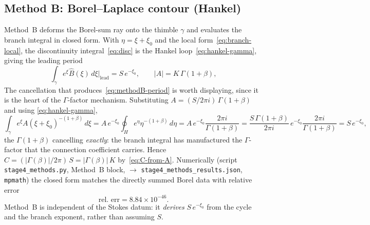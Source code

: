 \documentclass[11pt,reqno]{amsart}
\theoremstyle{plain}
\theoremstyle{definition}
\newcommand{\Bhat}{\widehat{B}}
\newcommand{\xizero}{\xi_0}
\providecommand{\C}{}\renewcommand{\C}{C}
\begin{document}
\subsection{Method B: Borel--Laplace contour (Hankel)}\label{sub:methodB}
Method~B deforms the Borel-sum ray onto the thimble $\gamma$ and evaluates the branch integral in
closed form. With $\eta=\xi+\xizero$ and the local form~\eqref{eq:branch-local}, the
discontinuity integral~\eqref{eq:disc} is the Hankel loop~\eqref{eq:hankel-gamma}, giving the
leading period
\begin{equation}\label{eq:methodB-period}
  \int_\gamma e^{\xi}\Bhat(\xi)\,d\xi\Big|_{\text{lead}}=S\,e^{-\xizero},\qquad
  \lvert A\rvert=K\,\Gamma(1+\beta),
\end{equation}
The cancellation that produces~\eqref{eq:methodB-period} is worth displaying, since it is the heart
of the $\Gamma$-factor mechanism. Substituting $A=(S/2\pi i)\,\Gamma(1+\beta)$ and using
\eqref{eq:hankel-gamma},
\begin{equation}\label{eq:methodB-chain}
  \int_\gamma e^{\xi}A(\xi+\xizero)^{-(1+\beta)}\,d\xi
  =A\,e^{-\xizero}\!\oint_{H}e^{\eta}\eta^{-(1+\beta)}\,d\eta
  =A\,e^{-\xizero}\frac{2\pi i}{\Gamma(1+\beta)}
  =\frac{S\,\Gamma(1+\beta)}{2\pi i}\,e^{-\xizero}\frac{2\pi i}{\Gamma(1+\beta)}
  =S\,e^{-\xizero},
\end{equation}
the $\Gamma(1+\beta)$ cancelling \emph{exactly}: the branch integral has manufactured the
$\Gamma$-factor that the connection coefficient carries. Hence
$\C=(\lvert\Gamma(\beta)\rvert/2\pi)\,S=\lvert\Gamma(\beta)\rvert\,K$
by~\eqref{eq:C-from-A}. Numerically (script \texttt{stage4\_methods.py}, Method~B block,
$\to$ \texttt{stage4\_methods\_results.json}, \texttt{mpmath}) the closed form
matches the directly summed Borel data with relative error
\begin{equation}\label{eq:methodB-err}
  \text{rel.\ err}=8.84\times10^{-46}.
\end{equation}
Method~B is independent of the Stokes datum: it \emph{derives} $S\,e^{-\xizero}$ from the cycle and
the branch exponent, rather than assuming $S$.
\end{document}
